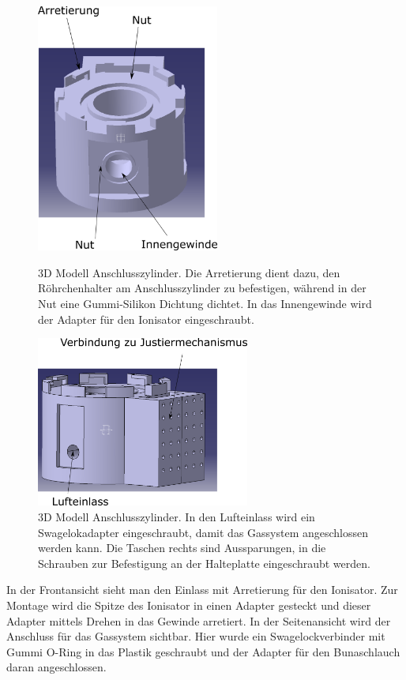 \begin{figure}[h!]
	\begin{minipage}[hbt]{6.0cm}
		\centering
		\includegraphics[width=6.0cm]{Zylinder_frontal.png}
		\caption[Zylinder V1 frontal]{3D Modell Anschlusszylinder. Die Arretierung dient dazu, den Röhrchenhalter am Anschlusszylinder zu befestigen, während in der Nut eine Gummi-Silikon Dichtung dichtet. In das Innengewinde wird der Adapter für den Ionisator eingeschraubt.}
	\end{minipage}
	\hfill
	\begin{minipage}[hbt]{7cm}
		\centering
		\includegraphics[width=7cm]{Zylinder_seitlich.png}
		\caption[Zylinder V1 seitlich]{3D Modell Anschlusszylinder. In den Lufteinlass wird ein Swagelokadapter eingeschraubt, damit das Gassystem angeschlossen werden kann. Die Taschen rechts sind Aussparungen, in die Schrauben zur Befestigung an der Halteplatte eingeschraubt werden.}
	\end{minipage}
\end{figure}


In der Frontansicht sieht man den Einlass mit Arretierung für den Ionisator. Zur Montage wird die Spitze des Ionisator in einen Adapter gesteckt und dieser Adapter mittels Drehen in das Gewinde arretiert. In der Seitenansicht wird der Anschluss für das Gassystem sichtbar. Hier wurde ein Swagelockverbinder mit Gummi O-Ring in das Plastik geschraubt und der Adapter für den Bunaschlauch daran angeschlossen.


